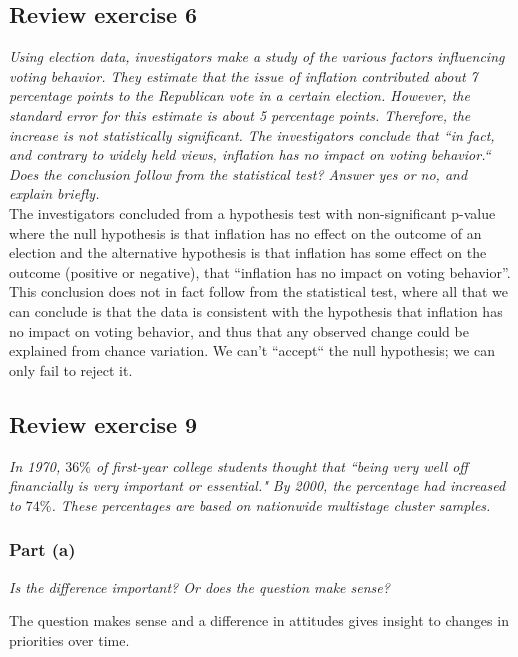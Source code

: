 \documentclass[11pt]{article}
\begin{document}
\subsection*{Review exercise 6} %
\textit{Using election data, investigators make a study of the various factors influencing voting behavior.  They estimate that the issue of inflation contributed about 7 percentage points to the Republican vote in a certain election. However, the standard error for this estimate is about 5 percentage points. Therefore, the increase is not statistically significant.  The investigators conclude that ``in fact, and contrary to widely held views, inflation has no impact on voting behavior.`` Does the conclusion follow from the statistical test?  Answer yes or no, and explain briefly.} \\

The investigators concluded from a hypothesis test with non-significant p-value where the null hypothesis is that inflation has no effect on the outcome of an election and the alternative hypothesis is that inflation has some effect on the outcome (positive or negative), that ``inflation has no impact on voting behavior''. This conclusion does not in fact follow from the statistical test, where all that we can conclude is that the data is consistent with the hypothesis that inflation has no impact on voting behavior, and thus that any observed change could be explained from chance variation.  We can't ``accept`` the null hypothesis; we can only fail to reject it.



\subsection*{Review exercise 9} %
\textit{In 1970, $ 36\% $ of first-year college students thought that ``being very well off financially is very important or essential."
By 2000, the percentage had increased to $ 74\% $.
These percentages are based on nationwide multistage cluster samples.}
\subsubsection*{Part (a)}
\textit{Is the difference important?
Or does the question make sense?}

\vspace{5mm}

The question makes sense and a difference in attitudes gives insight to changes in priorities over time.
\end{document}
